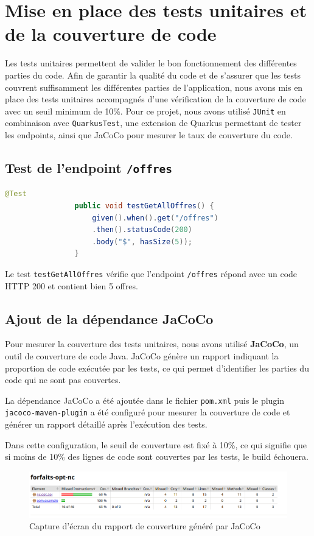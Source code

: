 \documentclass{article}
\begin{document}
	\section{Mise en place des tests unitaires et de la couverture de code}
	\label{subsec:test-offres}
	Les tests unitaires permettent de valider le bon fonctionnement des différentes parties du code.
	Afin de garantir la qualité du code et de s'assurer que les tests couvrent suffisamment les différentes parties de l'application, nous avons mis en place des tests unitaires accompagnés d'une vérification de la couverture de code avec un seuil minimum de 10\%. 
	Pour ce projet, nous avons utilisé \texttt{JUnit} en combinaison avec \texttt{QuarkusTest}, une extension de Quarkus permettant de tester les endpoints, ainsi que JaCoCo pour mesurer le taux de couverture du code. 
	
	\subsection{Test de l'endpoint \texttt{/offres}}
	

		\begin{lstlisting}[language=Java]
				@Test
				public void testGetAllOffres() {
					given().when().get("/offres")
					.then().statusCode(200)
					.body("$", hasSize(5));
				}
		\end{lstlisting}
			Le test \texttt{testGetAllOffres} vérifie que l'endpoint \texttt{/offres} répond avec un code HTTP 200 et contient bien 5 offres.

	
	\subsection{Ajout de la dépendance JaCoCo}
	Pour mesurer la couverture des tests unitaires, nous avons utilisé \textbf{JaCoCo}, un outil de couverture de code Java. JaCoCo génère un rapport indiquant la proportion de code exécutée par les tests, ce qui permet d'identifier les parties du code qui ne sont pas couvertes.
	
	La dépendance JaCoCo a été ajoutée dans le fichier \texttt{pom.xml} puis le plugin \texttt{jacoco-maven-plugin} a été configuré pour mesurer la couverture de code et générer un rapport détaillé après l'exécution des tests.
	
	Dans cette configuration, le seuil de couverture est fixé à 10\%, ce qui signifie que si moins de 10\% des lignes de code sont couvertes par les tests, le build échouera.
	
	\begin{figure}[h!]
		\centering
		\includegraphics[width=\textwidth]{asset/jacoco.png}
		\caption{Capture d'écran du rapport de couverture généré par JaCoCo}
		\label{fig:jacoco-report}
	\end{figure}
	
\end{document}
